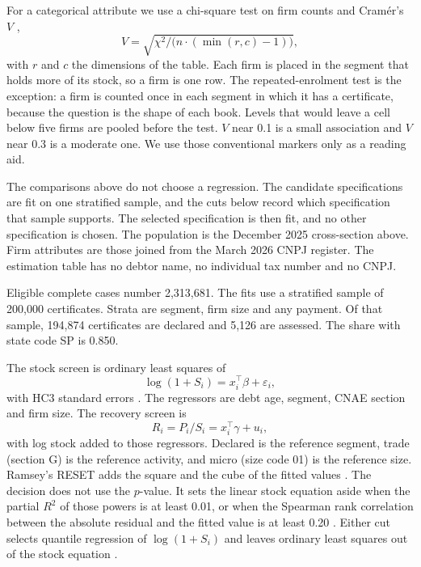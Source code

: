 For a categorical attribute we use a chi-square test on firm counts and Cram\'er's $V$ \citep{cramer1946},
\begin{equation}
V = \sqrt{\chi^2 / \big(n \cdot (\min(r, c) - 1)\big)},
\label{eq:v}
\end{equation}
with $r$ and $c$ the dimensions of the table.
Each firm is placed in the segment that holds more of its stock, so a firm is one row.
The repeated-enrolment test is the exception: a firm is counted once in each segment in which it has a certificate, because the question is the shape of each book.
Levels that would leave a cell below five firms are pooled before the test.
$V$ near 0.1 is a small association and $V$ near 0.3 is a moderate one.
We use those conventional markers only as a reading aid.

The comparisons above do not choose a regression.
The candidate specifications are fit on one stratified sample, and the cuts below record which specification that sample supports.
The selected specification is then fit, and no other specification is chosen.
The population is the December 2025 cross-section above.
Firm attributes are those joined from the March 2026 CNPJ register.
The estimation table has no debtor name, no individual tax number and no CNPJ.

Eligible complete cases number 2,313,681.
The fits use a stratified sample of 200,000 certificates.
Strata are segment, firm size and any payment.
Of that sample, 194,874 certificates are declared and 5,126 are assessed.
The share with state code SP is 0.850.

The stock screen is ordinary least squares of
\begin{equation}
\log(1 + S_i) = x_i^{\top}\beta + \varepsilon_i,
\label{eq:stock}
\end{equation}
with HC3 standard errors \citep{white1980,mackinnon1985}.
The regressors are debt age, segment, CNAE section and firm size.
The recovery screen is
\begin{equation}
R_i = P_i / S_i = x_i^{\top}\gamma + u_i,
\label{eq:recovery}
\end{equation}
with log stock added to those regressors.
Declared is the reference segment, trade (section G) is the reference activity, and micro (size code 01) is the reference size.
Ramsey's RESET adds the square and the cube of the fitted values \citep{ramsey1969}.
The decision does not use the $p$-value.
It sets the linear stock equation aside when the partial $R^2$ of those powers is at least 0.01, or when the Spearman rank correlation between the absolute residual and the fitted value is at least 0.20 \citep{spearman1904}.
Either cut selects quantile regression of $\log(1+S_i)$ and leaves ordinary least squares out of the stock equation \citep{koenker1978,koenker2001quantile}.

